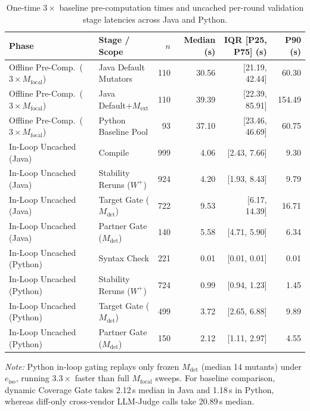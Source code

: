 \begin{table}[t]
\centering
\scriptsize
\setlength{\tabcolsep}{4.0pt}
\caption{One-time $3\times$ baseline pre-computation times and uncached per-round validation stage latencies across Java and Python.}
\label{tab:latency}
\begin{tabular}{llrrrr}
\toprule
Phase & Stage / Scope & $n$ & Median (s) & IQR [P25, P75] (s) & P90 (s) \\
\midrule
Offline Pre-Comp.\ ($3\times M_{\text{focal}}$) & Java Default Mutators & 110 & 30.56 & [21.19, 42.44] & 60.30 \\
Offline Pre-Comp.\ ($3\times M_{\text{focal}}$) & Java Default+$M_{\text{ext}}$ & 110 & 39.39 & [22.39, 85.91] & 154.49 \\
Offline Pre-Comp.\ ($3\times M_{\text{focal}}$) & Python Baseline Pool & 93 & 37.10 & [23.46, 46.69] & 60.75 \\
\midrule
In-Loop Uncached (Java) & Compile & 999 & 4.06 & [2.43, 7.66] & 9.30 \\
In-Loop Uncached (Java) & Stability Reruns ($W^+$) & 924 & 4.20 & [1.93, 8.43] & 9.79 \\
In-Loop Uncached (Java) & Target Gate ($M_{\text{det}}$) & 722 & 9.53 & [6.17, 14.39] & 16.71 \\
In-Loop Uncached (Java) & Partner Gate ($M_{\text{det}}$) & 140 & 5.58 & [4.71, 5.90] & 6.34 \\
\midrule
In-Loop Uncached (Python) & Syntax Check & 221 & 0.01 & [0.01, 0.01] & 0.01 \\
In-Loop Uncached (Python) & Stability Reruns ($W^+$) & 724 & 0.99 & [0.94, 1.23] & 1.45 \\
In-Loop Uncached (Python) & Target Gate ($M_{\text{det}}$) & 499 & 3.72 & [2.65, 6.88] & 9.89 \\
In-Loop Uncached (Python) & Partner Gate ($M_{\text{det}}$) & 150 & 2.12 & [1.11, 2.97] & 4.55 \\
\bottomrule
\end{tabular}
\par\smallskip\parbox{0.96\textwidth}{\scriptsize\textit{Note:} Python in-loop gating replays only frozen $M_{\text{det}}$ (median 14 mutants) under $e_{\text{iso}}$, running $3.3\times$ faster than full $M_{\text{focal}}$ sweeps. For baseline comparison, dynamic Coverage Gate takes 2.12\,s median in Java and 1.18\,s in Python, whereas diff-only cross-vendor LLM-Judge calls take 20.89\,s median.}
\end{table}
